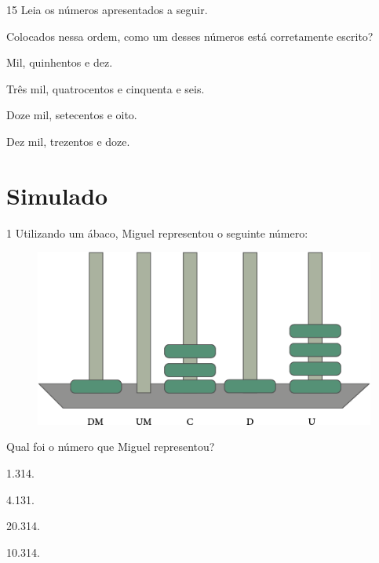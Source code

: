 \num{15} Leia os números apresentados a seguir.


Colocados nessa ordem, como um desses números está corretamente escrito?

\begin{escolha}
\item Mil, quinhentos e dez.

\item Três mil, quatrocentos e cinquenta e seis.

\item Doze mil, setecentos e oito.

\item Dez mil, trezentos e doze.
\end{escolha}
\pagebreak

\chapter[Simulado 2]{Simulado}

\vspace*{-1cm}

\num{1} Utilizando um ábaco, Miguel representou o seguinte número:

\begin{figure}[htpb!]
\centering
\includegraphics[width=.8\textwidth]{media/image80.png}
\end{figure}

Qual foi o número que Miguel representou?

\begin{multicols}{2}
\begin{escolha}
\item
  1.314.
\item
  4.131.
\item
  20.314.
\item
  10.314.
\end{escolha}
\end{multicols}

